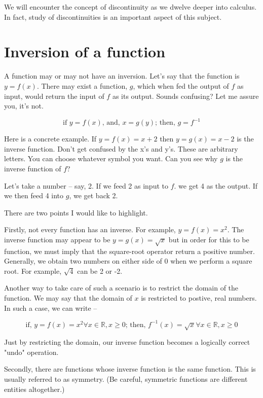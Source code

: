 We will encounter the concept of discontinuity as we dwelve deeper into calculus. In fact, study of discontinuities is an important aspect of this subject.

\section{Inversion of a function}

A function may or may not have an inversion. Let's say that the function is $y=f(x)$. There may exist a function, $g$, which when fed the output of $f$ as input, would return the input of $f$ as its output. Sounds confusing? Let me assure you, it's not.

\begin{equation}
    \text{if } y = f(x)\text{, and, } x = g(y)\text{; then, }g = f^{-1}
\end{equation}

Here is a concrete example. If $y = f(x) = x+2$ then $y = g(x) = x-2$ is the inverse function. Don't get confused by the x's and y's. These are arbitrary letters. You can choose whatever symbol you want. Can you see why $g$ is the inverse function of $f$?

Let's take a number -- say, 2. If we feed 2 as input to $f$. we get 4 as the output. If we then feed 4 into $g$, we get back 2.

There are two points I would like to highlight.

Firstly, not every function has an inverse. For example, $y = f(x) = x^2$. The inverse function may appear to be $y = g(x) = \sqrt{x}$ but in order for this to be function, we must imply that the square-root operator return a positive number. Generally, we obtain two numbers on either side of 0 when we perform a square root. For example, $\sqrt{4}$ can be 2 or -2.

Another way to take care of such a scenario is to restrict the domain of the function. We may say that the domain of $x$ is restricted to postive, real numbers. In such a case, we can write --

\[
  \text{if, }y = f(x) = x^{2} \forall x \in \mathbb{R}, x \ge 0\text{; then, }f^{-1}(x) = \sqrt{x} \forall x \in \mathbb{R}, x \ge 0
\]

Just by restricting the domain, our inverse function becomes a logically correct "undo" operation.

Secondly, there are functions whose inverse function is the same function. This is usually referred to as symmetry. (Be careful, symmetric functions are different entities altogether.)

